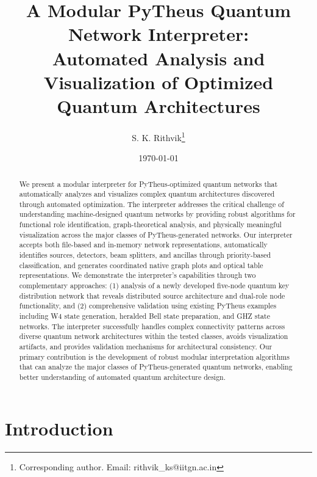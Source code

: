 \documentclass[11pt,a4paper]{article}
\begin{document}
\title{A Modular PyTheus Quantum Network Interpreter:\\
Automated Analysis and Visualization of Optimized Quantum Architectures}

\author[1,2]{S. K. Rithvik\thanks{Corresponding author. Email: rithvik\_ks@iitgn.ac.in}}

\date{\today}

\maketitle

\begin{abstract}
We present a modular interpreter for PyTheus-optimized quantum networks that automatically analyzes and visualizes complex quantum architectures discovered through automated optimization. The interpreter addresses the critical challenge of understanding machine-designed quantum networks by providing robust algorithms for functional role identification, graph-theoretical analysis, and physically meaningful visualization across the major classes of PyTheus-generated networks. Our interpreter accepts both file-based and in-memory network representations, automatically identifies sources, detectors, beam splitters, and ancillas through priority-based classification, and generates coordinated native graph plots and optical table representations. We demonstrate the interpreter's capabilities through two complementary approaches: (1) analysis of a newly developed five-node quantum key distribution network that reveals distributed source architecture and dual-role node functionality, and (2) comprehensive validation using existing PyTheus examples including W4 state generation, heralded Bell state preparation, and GHZ state networks. The interpreter successfully handles complex connectivity patterns across diverse quantum network architectures within the tested classes, avoids visualization artifacts, and provides validation mechanisms for architectural consistency. Our primary contribution is the development of robust modular interpretation algorithms that can analyze the major classes of PyTheus-generated quantum networks, enabling better understanding of automated quantum architecture design.
\end{abstract}

\section{Introduction}
\end{document}
